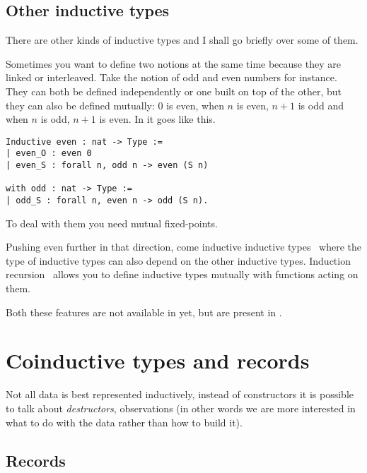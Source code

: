\subsection{Other inductive types}

There are other kinds of inductive types and I shall go briefly over some of
them.


Sometimes you want to define two notions at the same time because they are
linked or interleaved.
Take the notion of odd and even numbers for instance. They can both be defined
independently or one built on top of the other, but they can also be defined
mutually: \(0\) is even, when \(n\) is even, \(n+1\) is odd and when \(n\)
is odd, \(n+1\) is even.
In \Coq it goes like this.
\begin{verbatim}
Inductive even : nat -> Type :=
| even_O : even 0
| even_S : forall n, odd n -> even (S n)

with odd : nat -> Type :=
| odd_S : forall n, even n -> odd (S n).
\end{verbatim}

To deal with them you need mutual fixed-points.


Pushing even further in that direction, come inductive inductive
types~ where the type of inductive types
can also depend on the other inductive types.
Induction recursion~ allows you to define
inductive types mutually with functions acting on them.

Both these features are not available in \Coq yet, but are present in \Agda.

\section{Coinductive types and records}

Not all data is best represented inductively, instead of constructors it is
possible to talk about \emph{destructors}, \ie observations (in other words we
are more interested in what to do with the data rather than how to build it).

\subsection{Records}

